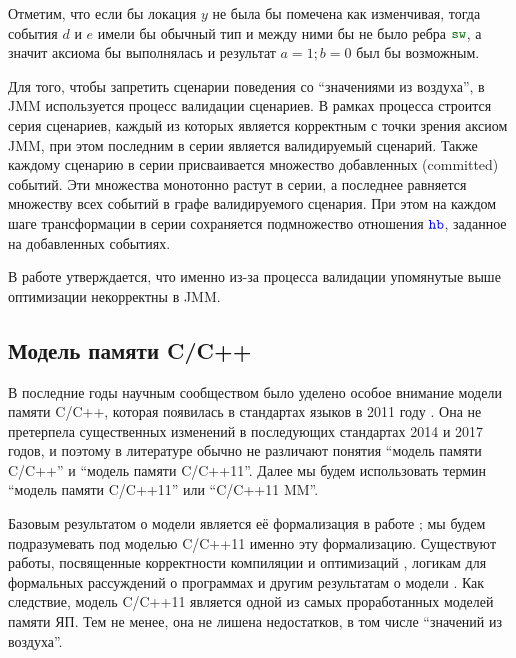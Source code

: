 Отметим, что если бы локация $y$ не была бы помечена как изменчивая, тогда события $d$ и $e$ имели бы
обычный тип и между ними бы не было ребра $\lSW$, а значит аксиома бы выполнялась и результат $a = 1; b = 0$
был бы возможным.



Для того, чтобы запретить сценарии поведения со ``значениями из воздуха'', в JMM используется процесс
валидации сценариев.
В рамках процесса строится серия сценариев, каждый из которых является корректным с точки зрения аксиом JMM,
при этом последним в серии является валидируемый сценарий.
Также каждому сценарию в серии присваивается множество добавленных (committed) событий.
Эти множества монотонно растут в серии, а последнее равняется множеству всех событий в графе валидируемого сценария.
При этом на каждом шаге трансформации в серии сохраняется подмножество отношения $\lHB$, заданное на добавленных
событиях.

В работе \cite{Sevcik-Aspinall:ECOOP08} утверждается, что именно из-за процесса валидации упомянутые выше оптимизации
некорректны в JMM.

\subsection{Модель памяти C/C++}
\label{sec:cppmodel}
В последние годы научным сообществом было уделено особое внимание модели памяти C/C++,
которая появилась в стандартах языков в 2011 году \cite{C:11,CPP:11}.
Она не претерпела существенных изменений в последующих стандартах 2014 \cite{CPP:14} и 2017 \cite{CPP:17} годов,
и поэтому в литературе обычно не различают понятия ``модель памяти C/C++'' и ``модель памяти C/C++11''.
Далее мы будем использовать термин ``модель памяти C/C++11'' или ``C/C++11 MM''.

Базовым результатом о модели является её формализация в работе \cite{Batty-al:POPL11};
мы будем подразумевать под моделью C/C++11 именно эту формализацию.
Существуют работы, посвященные корректности компиляции и оптимизаций
\cite{Batty-al:POPL12,Vafeiadis-al:POPL15,Chakraborty-Vafeiadis:CGO16,Lahav-al:PLDI17,Batty-al:POPL16},
логикам для формальных рассуждений о программах
\cite{Turon-al:OOPSLA14,Vafeiadis-Narayan:OOPSLA13,Lahav-Vafeiadis:ICALP15,Doko-Vafeiadis:VMCAI16,Vafeiadis:CPP15}
и другим результатам о модели
\cite{Batty-al:POPL13,Batty-al:ESOP15,Lidbury-Donaldson:POPL17, Tassarotti-al:PLDI15,Doko-Vafeiadis:ESOP17}.
Как следствие, модель C/C++11 является одной из самых проработанных моделей памяти ЯП.
Тем не менее, она не лишена недостатков, в том числе ``значений из воздуха''.

